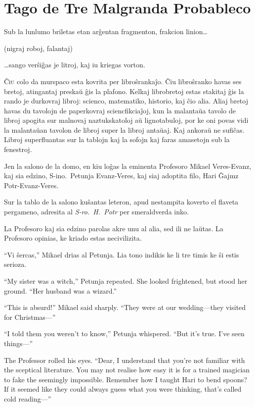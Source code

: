 \chapter{Tago de Tre Malgranda Probableco}

\begin{chapterOpeningQuote}
\noindent
Sub la lunlumo briletas etan arĝentan fragmenton, frakcion linion…

\vspace*{2ex}
(nigraj roboj, falantaj)

\vspace*{2ex}
…sango verŝiĝas je litroj, kaj iu kriegas vorton.
\end{chapterOpeningQuote}

\lettrine{Ĉ}{iu} colo da murspaco esta kovrita per libroŝrankaĵo. Ĉiu libroŝranko havas ses bretoj, atingantaj preskaŭ ĝis la plafono. Kelkaj librobretoj estas stakitaj ĝis la rando je durkovraj libroj: scienco, matematiko, historio, kaj ĉio alia. Aliaj bretoj havas du tavolojn de paperkovraj sciencfikciaĵoj, kun la malantaŭa tavolo de libroj apogita sur malnovaj naztukskatoloj aŭ lignotabuloj, por ke oni povas vidi la malantaŭan tavolon de libroj super la libroj antaŭaj. Kaj ankoraŭ ne sufiĉas. Libroj superfluantas sur la tablojn kaj la sofojn kaj faras amasetojn sub la fenestroj.

Jen la salono de la domo, en kiu loĝas la eminenta Profesoro Mikael Veres\nobreakdash-Evanz, kaj sia edzino, S\nobreakdash-ino.~Petunja Evanz\nobreakdash-Veres, kaj siaj adoptita filo, Hari Ĝajmz Potr-Evanz-Veres.

Sur la tablo de la salono kuŝantas leteron, apud nestampita koverto el flaveta pergameno, adresita al \emph{S\nobreakdash-ro.~H.~Potr} per smeraldverda inko.

La Profesoro kaj sia edzino parolas akre unu al alia, sed ili ne laŭtas. La Profesoro opinias, ke kriado estas necivilizita.

“Vi ŝercas,” Mikael drias al Petunja. Lia tono indikis ke li tre timis ke ŝi estis serioza.

“My sister was a witch,” Petunja repeated. She looked frightened, but stood her ground. “Her husband was a wizard.”

“This is absurd!” Mikael said sharply. “They were at our wedding—they visited for Christmas—”

“I told them you weren’t to know,” Petunja whispered. “But it’s true. I’ve seen things—”

The Professor rolled his eyes. “Dear, I understand that you’re not familiar with the sceptical literature. You may not realise how easy it is for a trained magician to fake the seemingly impossible. Remember how I taught Hari to bend spoons? If it seemed like they could always guess what you were thinking, that’s called cold reading—”

